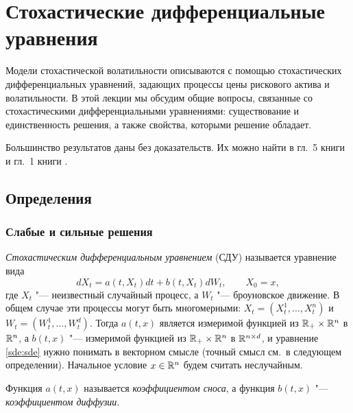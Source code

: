 
\chapter{Стохастические дифференциальные уравнения}
\label{ch:sde}
\chaptertoc

Модели стохастической волатильности описываются с помощью стохастических дифференциальных уравнений, задающих процессы цены рискового актива и волатильности.
В этой лекции мы обсудим общие вопросы, связанные со стохастическими дифференциальными уравнениями: существование и единственность решения, а также свойства, которыми решение обладает.

Большинство результатов даны без доказательств.
Их можно найти в гл.~5 книги \cite{KaratzasShreve91} и гл.~1 книги \cite{ChernyEngelbert}.


\section{Определения}
\subsection{Слабые и сильные решения}

\emph{Стохастическим дифференциальным уравнением} (СДУ) называется уравнение вида
\begin{equation}
\label{sde:sde}
d X_t = a(t,X_t)dt + b(t,X_t)dW_t, \qquad X_0=x,
\end{equation}
где $X_t$ "--- неизвестный случайный процесс, а $W_t$ "--- броуновское движение.
В общем случае эти процессы могут быть многомерными: $X_t = (X_t^1,\dots,X_t^n)$ и $W_t=(W_t^1,\dots,W_t^d)$.
Тогда $a(t,x)$ является измеримой функцией из $\mathbb{R}_+\times\mathbb{R}^n$ в $\mathbb{R}^n$, а $b(t,x)$ "--- измеримой функцией из $\mathbb{R}_+\times\mathbb{R}^n$ в $\mathbb{R}^{n\times d}$, и уравнение \eqref{sde:sde} нужно понимать в векторном смысле (точный смысл см.\ в следующем определении).
Начальное условие $x\in\mathbb{R}^n$ будем считать неслучайным.

Функция $a(t,x)$ называется \emph{коэффициентом сноса}, а функция $b(t,x)$ "--- \emph{коэффициентом диффузии}.


